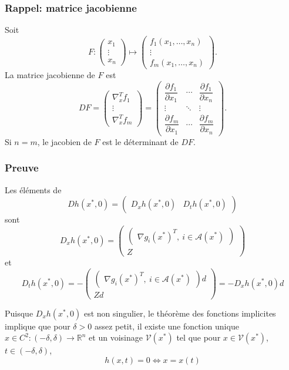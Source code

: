 \documentclass[usepdftitle=false]{beamer}
\def\cA{\mathcal{A}}
\def\cV{\mathcal{V}}
\def\RR{\mathbb{R}}
\begin{document}
\begin{frame}
\frametitle{Rappel: matrice jacobienne}

Soit
$$
F:{\begin{pmatrix}x_{1}\\\vdots \\x_{n}\end{pmatrix}}
\longmapsto {\begin{pmatrix}f_{1}(x_{1},\dots ,x_{n})\\\vdots \\f_{m}(x_{1},\dots ,x_{n})\end{pmatrix}}.
$$
La matrice jacobienne de $F$ est
$$
DF
=
\begin{pmatrix}
\nabla_x^T f_1 \\
\vdots \\
\nabla_x^T f_m
\end{pmatrix}
=
{\begin{pmatrix}{\dfrac {\partial f_{1}}{\partial x_{1}}}&\cdots &{\dfrac {\partial f_{1}}{\partial x_{n}}}\\\vdots &\ddots &\vdots \\{\dfrac {\partial f_{m}}{\partial x_{1}}}&\cdots &{\dfrac {\partial f_{m}}{\partial x_{n}}}\end{pmatrix}}.
$$
Si $n = m$, le jacobien de $F$ est le déterminant de $DF$.

\end{frame}

\begin{frame}
\frametitle{Preuve}
Les éléments de
$$
D h(x^*, 0) =
\begin{pmatrix}
D_x h(x^*, 0) & D_t h(x^*, 0)
\end{pmatrix}
$$
sont
$$
D_x h(x^*, 0) =
\begin{pmatrix}
\begin{pmatrix}
\nabla g_i(x^*)^T, \ i \in \cA(x^*)
\end{pmatrix} \\
 Z
\end{pmatrix}
$$
et
$$
D_t h(x^*, 0) =
- \begin{pmatrix}
\begin{pmatrix}
\nabla g_i(x^*)^T, \ i \in \cA(x^*)
\end{pmatrix}d \\
Zd
\end{pmatrix}
= -D_x h(x^*, 0)d
$$

Puisque $D_x h(x^*, 0)$ est non singulier, le théorème des fonctions implicites implique que pour $\delta > 0$ assez petit, il existe une fonction unique $x \in C^2: (-\delta, \delta) \rightarrow \RR^n$ et un voisinage $\cV(x^*)$ tel que pour $x \in \cV(x^*)$, $t \in (-\delta, \delta)$,
$$
h(x,t) = 0 \Leftrightarrow x = x(t)
$$

\end{frame}
\end{document}
